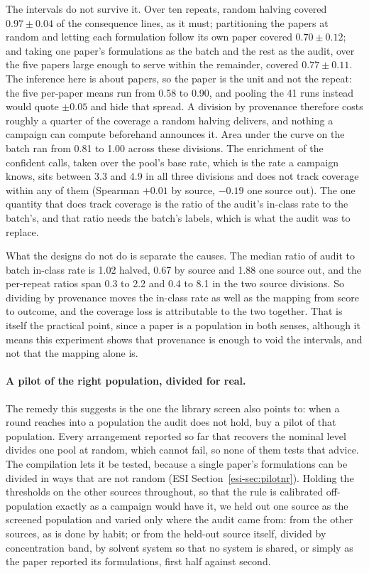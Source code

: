 \documentclass[twocolumn,10pt]{article}
\begin{document}
The intervals do not survive it. Over ten repeats, random halving covered $0.97\pm0.04$ of
the consequence lines, as it must; partitioning the papers at random and letting each
formulation follow its own paper covered $0.70\pm0.12$; and taking one paper's formulations
as the batch and the rest as the audit, over the five papers large enough to serve within the
remainder, covered $0.77\pm0.11$. The inference here is about papers, so the paper is the
unit and not the repeat: the five per-paper means run from 0.58 to 0.90, and pooling the 41
runs instead would quote $\pm0.05$ and hide that spread. A division by provenance therefore costs
roughly a quarter of the coverage a random halving delivers, and nothing a campaign can
compute beforehand announces it. Area under the curve on the batch ran from 0.81 to 1.00
across these divisions. The enrichment of the confident calls, taken over the pool's base
rate, which is the rate a campaign knows, sits between 3.3 and 4.9 in all three divisions and
does not track coverage within any of them (Spearman $+0.01$ by source, $-0.19$ one source
out). The one quantity that does track coverage is the ratio of the audit's in-class rate to
the batch's, and that ratio needs the batch's labels, which is what the audit was to replace.

What the designs do not do is separate the causes. The median ratio of audit to batch
in-class rate is 1.02 halved, 0.67 by source and 1.88 one source out, and the per-repeat
ratios span 0.3 to 2.2 and 0.4 to 8.1 in the two source divisions. So dividing by provenance
moves the in-class rate as well as the mapping from score to outcome, and the coverage loss
is attributable to the two together. That is itself the practical point, since a paper is a population in both senses, although it means this experiment shows that provenance is enough to void the intervals, and not that the mapping alone is.

\paragraph{A pilot of the right population, divided for real.} The remedy this suggests is
the one the library screen also points to: when a round reaches into a population the audit
does not hold, buy a pilot of that population. Every arrangement reported so far that recovers
the nominal level divides one pool at random, which cannot fail, so none of them tests that
advice. The compilation lets it be tested, because a single paper's formulations can be divided in ways that are not random (ESI Section~\ref{esi-sec:pilotnr}). Holding the thresholds on the other sources throughout,
so that the rule is calibrated off-population exactly as a campaign would have it, we held out
one source as the screened population and varied only where the audit came from: from the other sources, as is done by habit; or from the held-out source itself, divided by
concentration band, by solvent system so that no system is shared, or simply as the paper
reported its formulations, first half against second.
\end{document}
